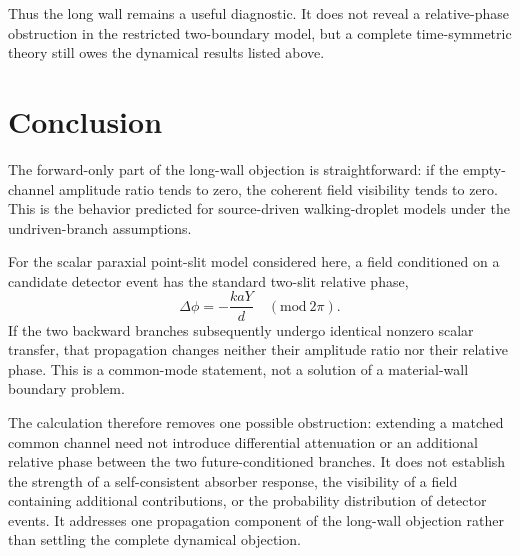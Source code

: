 \documentclass[11pt]{article}
\begin{document}
Thus the long wall remains a useful diagnostic.  It does not reveal a relative-phase obstruction in the restricted two-boundary model, but a complete time-symmetric theory still owes the dynamical results listed above.

\section{Conclusion}

The forward-only part of the long-wall objection is straightforward: if the empty-channel amplitude ratio tends to zero, the coherent field visibility tends to zero.  This is the behavior predicted for source-driven walking-droplet models under the undriven-branch assumptions.

For the scalar paraxial point-slit model considered here, a field conditioned on a candidate detector event has the standard two-slit relative phase,
\begin{equation}
 \Delta\phi=-\frac{kaY}{d}
 \quad(\mathrm{mod}\ 2\pi).
\end{equation}
If the two backward branches subsequently undergo identical nonzero scalar transfer, that propagation changes neither their amplitude ratio nor their relative phase.  This is a common-mode statement, not a solution of a material-wall boundary problem.

The calculation therefore removes one possible obstruction: extending a matched common channel need not introduce differential attenuation or an additional relative phase between the two future-conditioned branches.  It does not establish the strength of a self-consistent absorber response, the visibility of a field containing additional contributions, or the probability distribution of detector events.  It addresses one propagation component of the long-wall objection rather than settling the complete dynamical objection.
\end{document}
